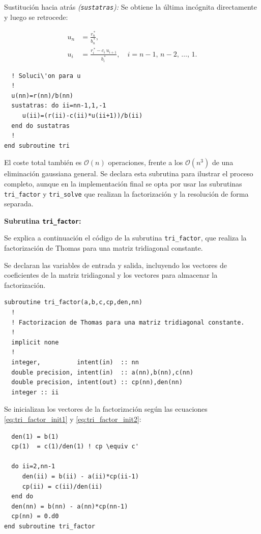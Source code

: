 \documentclass[11pt,a4paper]{article}
\begin{document}
\medskip

Sustituci\'on hacia atr\'as \textit{(\texttt{sustatras}):}
Se obtiene la \'ultima inc\'ognita directamente y luego se retrocede:

\begin{align}
u_{n} &= \frac{r_{n}^{\,*}}{b_{n}^{\,*}}, \\[4pt]
u_{i} &= \frac{r_{i}^{\,*} - c_{i}\, u_{i+1}}{b_{i}^{\,*}},
\quad i = n-1,\, n-2,\, \ldots,\, 1.
\end{align}

\begin{verbatim}
  ! Soluci\'on para u
  !
  u(nn)=r(nn)/b(nn)
  sustatras: do ii=nn-1,1,-1
     u(ii)=(r(ii)-c(ii)*u(ii+1))/b(ii)
  end do sustatras
  !
end subroutine tri
\end{verbatim}

El coste total tambi\'en es $\mathcal{O}(n)$ operaciones, frente a los
$\mathcal{O}(n^3)$ de una eliminaci\'on gaussiana general. Se declara esta
subrutina para ilustrar el proceso completo, aunque en la implementaci\'on
final se opta por usar las subrutinas \verb|tri_factor| y \verb|tri_solve|
que realizan la factorizaci\'on y la resoluci\'on de forma separada.

\medskip

\textbf{Subrutina \texttt{tri\_factor}:}

\medskip

Se explica a continuaci\'on el c\'odigo de la subrutina \verb|tri_factor|, 
que realiza la factorizaci\'on de Thomas para una matriz tridiagonal 
constante.

\medskip

Se declaran las variables de entrada y salida, incluyendo los vectores de 
coeficientes de la matriz tridiagonal y los vectores para almacenar la 
factorizaci\'on.

\begin{verbatim}
subroutine tri_factor(a,b,c,cp,den,nn)
  !
  ! Factorizacion de Thomas para una matriz tridiagonal constante.
  !
  implicit none
  !
  integer,          intent(in)  :: nn
  double precision, intent(in)  :: a(nn),b(nn),c(nn)
  double precision, intent(out) :: cp(nn),den(nn)
  integer :: ii
\end{verbatim}

Se inicializan los vectores de la factorización seg\'un las ecuaciones 
\ref{eq:tri_factor_init1} y \ref{eq:tri_factor_init2}:

\begin{verbatim}
  den(1) = b(1)
  cp(1)  = c(1)/den(1) ! cp \equiv c'

  do ii=2,nn-1
     den(ii) = b(ii) - a(ii)*cp(ii-1)
     cp(ii) = c(ii)/den(ii)
  end do
  den(nn) = b(nn) - a(nn)*cp(nn-1)
  cp(nn) = 0.d0
end subroutine tri_factor
\end{verbatim}
\end{document}
